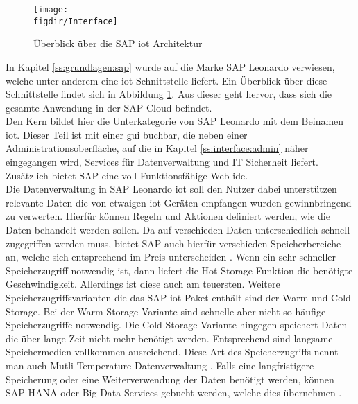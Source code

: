 \begin{figure}[!b]
	\centering
	\texttt{[image: \\figdir/Interface]}
	\caption{Überblick über die SAP \ac{iot} Architektur \cite[Seiten 117, 164, 181, 184, 201, 208, 221]{Holtschulte20:IOS}}
	\label{FIG:Interface}
\end{figure}

In Kapitel \ref{ss:grundlagen:sap} wurde auf die Marke SAP Leonardo verwiesen, welche unter anderem eine \ac{iot} Schnittstelle liefert. Ein Überblick über diese Schnittstelle findet sich in Abbildung \ref{FIG:Interface}. Aus dieser geht hervor, dass sich die gesamte Anwendung in der SAP Cloud befindet.\\

\noindent Den Kern bildet hier die Unterkategorie von SAP Leonardo mit dem Beinamen \ac{iot}. Dieser Teil ist mit einer \ac{gui} buchbar, die neben einer Administrationsoberfläche, auf die in Kapitel \ref{ss:interface:admin} näher eingegangen wird, Services für Datenverwaltung und IT Sicherheit liefert. Zusätzlich bietet SAP eine voll Funktionsfähige Web \ac{ide}.\\

\noindent Die Datenverwaltung in SAP Leonardo \ac{iot} soll den Nutzer dabei unterstützen relevante Daten die von etwaigen \ac{iot} Geräten empfangen wurden gewinnbringend zu verwerten. Hierfür können Regeln und Aktionen definiert werden, wie die Daten behandelt werden sollen. Da auf verschieden Daten unterschiedlich schnell zugegriffen werden muss, bietet SAP auch hierfür verschieden Speicherbereiche an, welche sich entsprechend im Preis unterscheiden \cite[Seite 173]{Holtschulte20:IOS}. Wenn ein sehr schneller Speicherzugriff notwendig ist, dann liefert die Hot Storage Funktion die benötigte Geschwindigkeit. Allerdings ist diese auch am teuersten. Weitere Speicherzugriffsvarianten die das SAP \ac{iot} Paket enthält sind der Warm und Cold Storage. Bei der Warm Storage Variante sind schnelle aber nicht so häufige Speicherzugriffe notwendig. Die Cold Storage Variante hingegen speichert Daten die über lange Zeit nicht mehr benötigt werden. Entsprechend sind langsame Speichermedien vollkommen ausreichend. Diese Art des Speicherzugriffs nennt man auch Mutli Temperature Datenverwaltung \cite[Seite 118f]{Holtschulte20:IOS}. Falls eine langfristigere Speicherung oder eine Weiterverwendung der Daten benötigt werden, können SAP HANA oder Big Data Services gebucht werden, welche dies übernehmen \cite[Seite 173]{Holtschulte20:IOS}.\\    


